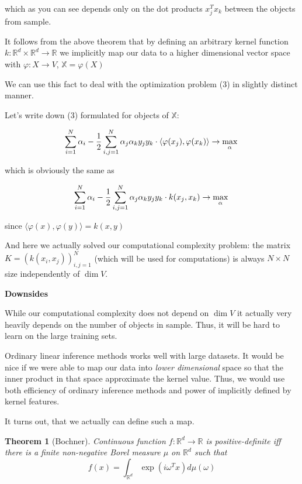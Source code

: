 \documentclass{article}
\theoremstyle{bfnote}
\newtheorem{thm}{Theorem}
\begin{document}
	which as you can see depends only on the dot products $x_j^T x_k$ between the objects from sample.



	It follows from the above theorem that by defining an arbitrary kernel function
	$k:\mathbb{R}^d \times \mathbb{R}^d \rightarrow \mathbb{R}$ 
	we implicitly map our data to a higher dimensional vector space with $\varphi: X \rightarrow V$, $\mathbb{X} = \varphi(X)$
	
	
	We can use this fact to deal with the optimization problem (3) in slightly distinct manner.
	
	Let's write down (3) formulated for objects of $\mathbb{X}$:
	
	$$
	\sum_{i=1}^N {\alpha_i} - \frac{1}{2}\sum_{i,j=1}^N \alpha_j \alpha_k y_j y_k \cdot \langle \varphi(x_j), \varphi(x_k) \rangle
	\rightarrow \max\limits_{\alpha} \\
	$$
	
	which is obviously the same as
	
	$$
		\sum_{i=1}^N {\alpha_i} - \frac{1}{2}\sum_{i,j=1}^N \alpha_j \alpha_k y_j y_k 
	\cdot k(x_j, x_k)
	\rightarrow \max\limits_{\alpha} \\
	$$
	
	since $\langle \varphi(x), \varphi(y) \rangle = k(x, y)$
	
	And here we actually solved our computational complexity problem: the matrix $K=(k(x_i, x_j))_{i, j=1}^N$ (which will be used for computations) is always $N \times N$ size independently of $\dim V$.
	
	\textbf{Downsides}
	
	While our computational complexity does not depend on $\dim V$ it actually very heavily depends on the number of objects in sample. Thus, it will be hard to learn on the large training sets.
	
	Ordinary linear inference methods works well with large datasets. It would be nice if we were able to map our data into \textit{lower dimensional} space so that the inner product in that space approximate the kernel value. Thus, we would use both efficiency of ordinary inference methods and power of implicitly defined by kernel features.
	
	It turns out, that we actually can define such a map.
	
	\begin{thm}[Bochner]
		Continuous function $f:\mathbb{R}^d \rightarrow \mathbb{R}$ is positive-definite iff there is a finite non-negative Borel
		measure $\mu$ on $\mathbb{R}^d$ such that
		$$
		f(x) =  \int_{\mathbb{R}^d} \exp(i \omega ^T x) d \mu(\omega)
		$$
	\end{thm}
\end{document}
